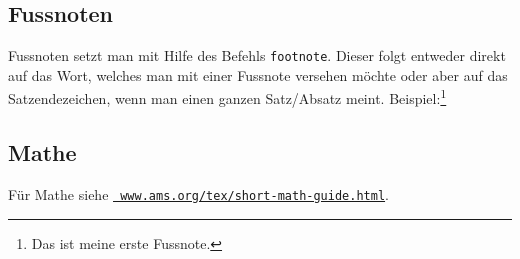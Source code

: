     
\subsection{Fussnoten}
    Fussnoten setzt man mit Hilfe des Befehls \texttt{footnote}. Dieser folgt
    entweder direkt auf das Wort, welches man mit einer Fussnote versehen möchte
    oder aber auf das Satzendezeichen, wenn man einen ganzen Satz/Absatz meint.
    Beispiel:\footnote{Das ist meine erste Fussnote.}
    
    
\subsection{Mathe}
Für Mathe siehe \href{http://www.ams.org/tex/short-math-guide.html}{{\tt
www.ams.org/tex/short-math-guide.html}}.


    
    
    
